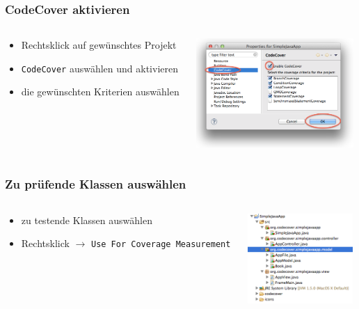 \documentclass{beamer}
\begin{document}
  \begin{frame}
    \frametitle{CodeCover aktivieren}
    \begin{columns}
      \begin{column}{4cm}
        \begin{itemize}
          \item Rechtsklick auf gewünschtes Projekt
          \item \texttt{CodeCover} auswählen und aktivieren
          \item die gewünschten Kriterien auswählen
        \end{itemize}
        \vspace{2cm}
      \end{column}
      \begin{column}{6cm}
        \begin{overprint}
          \includegraphics[width=6cm]{pictures/activate.png}
        \end{overprint}
      \end{column}
    \end{columns}
  \end{frame}

  \begin{frame}
    \frametitle{Zu prüfende Klassen auswählen}
    \begin{columns}
      \begin{column}{5cm}
        \begin{itemize}
          \item zu testende Klassen auswählen
          \item Rechtsklick $\rightarrow$ \texttt{Use For Coverage Measurement}
        \end{itemize}
        \vspace{2cm}
      \end{column}
      \begin{column}{5cm}
        \begin{overprint}
          \includegraphics[width=4cm]{pictures/testclasses.png}
        \end{overprint}
      \end{column}
    \end{columns}
  \end{frame}
\end{document}
